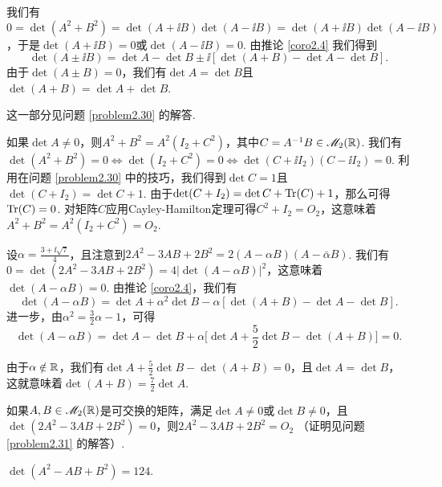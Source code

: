 \begin{solution}
  我们有$0=\det(A^2+B^2)=\det(A+\ii B)\det(A-\ii B)=\det(A+\ii B)\det(A-\ii B)$，于是$\det(A+\ii B)=0$或$\det(A-\ii B)=0$. 由推论 \ref{coro2.4} 我们得到
  \[
    \det (A \pm \ii B) = \det A - \det B \pm \ii
    [ \det(A + B) - \det A - \det B ].
  \]
  由于$\det(A\pm B)=0$，我们有$\det A=\det B$且$\det(A+B)=\det A+\det B$.
\end{solution}

\begin{solution}
  \begin{inparaenum}[(a)]
    \item 这一部分见问题 \ref{problem2.30} 的解答.

    \item 如果$\det A\ne0$，则$A^2+B^2=A^2(I_2+C^2)$，其中$C=A^{-1}B\in\mathscr M_2(\mathbb R)$. 我们有$\det(A^2+B^2)=0\Leftrightarrow\det(I_2+C^2)=0
        \Leftrightarrow\det(C+\ii I_2)(C-\ii I_2)=0$. 利用在问题 \ref{problem2.30} 中的技巧，我们得到$\det C=1$且$\det(C+I_2)=\det C+1$. 由于$\det(C+I_2)=\det C+\operatorname{Tr}(C)+1$，那么可得$\operatorname{Tr}(C)=0$. 对矩阵$C$应用Cayley-Hamilton定理可得$C^2+I_2=O_2$，这意味着$A^2+B^2=A^2(I_2+C^2)=O_2$.
  \end{inparaenum}
\end{solution}

\begin{solution}
  设$\alpha=\frac{3+\ii\sqrt7}4$，且注意到$2A^2-3AB+2B^2=2(A-\alpha B)(A-\bar \alpha B)$. 我们有$0=\det(2A^2-3AB+2B^2)=4|\det(A-\alpha B)|^2$，这意味着$\det(A-\alpha B)=0$. 由推论 \ref{coro2.4}，我们有
  \[
    \det(A - \alpha B) = \det A + \alpha^2\det B - \alpha [\det(A + B) - \det A - \det B].
  \]
  进一步，由$\alpha^2=\frac32\alpha-1$，可得
  \[
    \det (A - \alpha B) = \det A - \det B + \alpha
    \Big[ \det A + \frac52\det B - \det(A + B) \Big] = 0.
  \]

  由于$\alpha\notin\mathbb R$，我们有$\det A + \frac52\det B-\det(A+B)=0$，且$\det A=\det B$，这就意味着$\det(A+B)=\frac72\det A$.
\end{solution}
\begin{remark}
  如果$A,B\in\mathscr M_2(\mathbb R)$是可交换的矩阵，满足$\det A\ne0$或$\det B\ne0$，且$\det(2A^2-3AB+2B^2)=0$，则$2A^2-3AB+2B^2=O_2$
  （证明见问题 \ref{problem2.31} 的解答）.
\end{remark}

\begin{solution}
  $\det(A^2-AB+B^2)=124$.
\end{solution}

